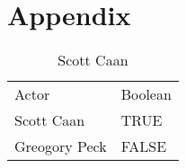 \chapter{Appendix}
\begin{table}[]
\centering
\caption{Scott Caan}
\label{table1}
\begin{tabular}{ll}
Actor                    & Boolean \\
Scott Caan          & TRUE    \\
Greogory Peck    & FALSE  
\end{tabular}
\end{table}
